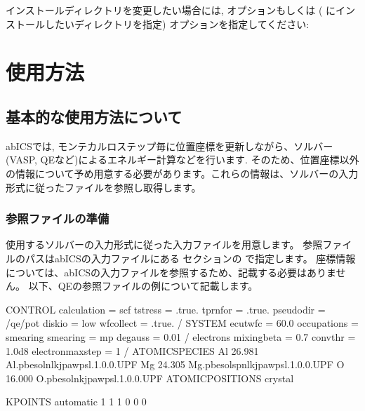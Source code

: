 \documentclass[letterpaper,10pt,dvipdfmx]{sphinxmanual}
\begin{document}
インストールディレクトリを変更したい場合には,  オプションもしくは  (  にインストールしたいディレクトリを指定) オプションを指定してください:



\chapter{使用方法}
\label{\detokenize{how_to_use/index::doc}}\label{\detokenize{how_to_use/index:id1}}

\section{基本的な使用方法について}
\label{\detokenize{how_to_use/basic_usage::doc}}\label{\detokenize{how_to_use/basic_usage:id1}}
abICSでは, モンテカルロステップ毎に位置座標を更新しながら、ソルバー(VASP, QEなど)によるエネルギー計算などを行います.
そのため、位置座標以外の情報について予め用意する必要があります。これらの情報は、ソルバーの入力形式に従ったファイルを参照し取得します。


\subsection{参照ファイルの準備}
\label{\detokenize{how_to_use/basic_usage:id2}}
使用するソルバーの入力形式に従った入力ファイルを用意します。
参照ファイルのパスはabICSの入力ファイルにある \sphinxcode{{[}solver{]}} セクションの  で指定します。
座標情報については、abICSの入力ファイルを参照するため、記載する必要はありません。
以下、QEの参照ファイルの例について記載します。

\begin{sphinxVerbatim}[commandchars=\\\{\}]
\PYGZam{}CONTROL
  calculation = \PYGZsq{}scf\PYGZsq{}
  tstress = .true.
  tprnfor = .true.
  pseudo\PYGZus{}dir = \PYGZsq{}\PYGZti{}/qe/pot\PYGZsq{}
  disk\PYGZus{}io = \PYGZsq{}low\PYGZsq{}
  wf\PYGZus{}collect = .true.
/
\PYGZam{}SYSTEM
  ecutwfc      =  60.0
  occupations  = \PYGZdq{}smearing\PYGZdq{}
  smearing     = \PYGZdq{}m\PYGZhy{}p\PYGZdq{}
  degauss      = 0.01
/
\PYGZam{}electrons
  mixing\PYGZus{}beta = 0.7
  conv\PYGZus{}thr = 1.0d\PYGZhy{}8
  electron\PYGZus{}maxstep = 1
/
ATOMIC\PYGZus{}SPECIES
Al 26.981 Al.pbesol\PYGZhy{}nl\PYGZhy{}kjpaw\PYGZus{}psl.1.0.0.UPF
Mg 24.305 Mg.pbesol\PYGZhy{}spnl\PYGZhy{}kjpaw\PYGZus{}psl.1.0.0.UPF
O  16.000 O.pbesol\PYGZhy{}n\PYGZhy{}kjpaw\PYGZus{}psl.1.0.0.UPF
ATOMIC\PYGZus{}POSITIONS crystal

K\PYGZus{}POINTS automatic
1 1 1 0 0 0
\end{sphinxVerbatim}
\end{document}
